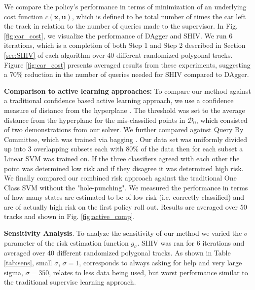 \documentclass[10pt, conference]{ieeeconf}      %
\newcommand{\bu}{\mathbf{u}}
\newcommand{\bx}{\mathbf{x}}
\begin{document}
We compare the policy's performance in terms of minimization of an underlying cost function $c(\bx,\bu)$, which is
defined to be total number of times the car left the track in relation to the number of queries made to the supervisor.
In Fig. \ref{fig:car_cost}, we visualize the performance of DAgger and SHIV.  We run 6 iterations, which is a completion of both Step 1 and Step 2 described in Section \ref{sec:SHIV} of each algorithm over 40 different
randomized polygonal tracks. Figure \ref{fig:car_cost} presents averaged
results from these experiments, suggesting a $70\%$ reduction in the number of queries needed for SHIV compared to DAgger. 
 
\textbf{Comparison to active learning approaches:}
To compare our method against a traditional confidence based active learning approach, we use a confidence measure  of distance from the hyperplane \cite{tong2002support}. The threshold was set to the average distance from the hyperplane for the mis-classified points in $\mathcal{D}_0$, which consisted of two demonstrations from our solver. We further compared against Query By Committee, which was trained via bagging \cite{breiman1996bagging}. Our data set was uniformly divided up into 3 overlapping subsets each with $80\%$ of the data then for each subset a Linear SVM was trained on. If the three classifiers agreed with each other the point was determined low risk and if they disagree it was determined high risk. We finally compared our combined risk approach against the traditional One Class SVM without the "hole-punching". We measured the performance in terms of how many states are estimated to be of low risk (i.e. correctly classified) and are of actually high risk on the first policy roll out. Results  are averaged over 50 tracks and shown in Fig. \ref{fig:active_comp}. 

\textbf{Sensitivity Analysis}. 
To analyze the sensitivity of our method we varied the $\sigma$ parameter of the risk estimation function $g_{\sigma}$. SHIV was ran for 6 iterations and averaged over 40 different randomized polygonal tracks. As shown in Table \ref{tab:sens}, small $\sigma$, $\sigma = 1$, corresponds to always asking for help and very large sigma, $\sigma = 350$, relates to  less data being used, but worst performance similar to the traditional supervise learning approach. 
\end{document}
